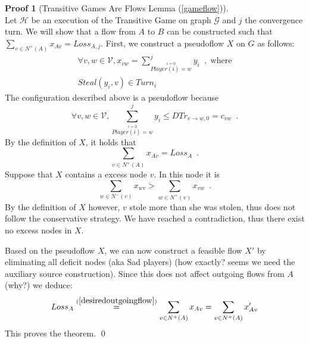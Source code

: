 \documentclass[11pt]{llncs}
\theoremstyle{definition}
\newtheorem{sepproof}{Proof}
\begin{document}
    \begin{sepproof}[Transitive Games Are Flows Lemma (\ref{gameflow})] \ \\
       Let $\mathcal{H}$ be an execution of the Transitive Game on graph $\mathcal{G}$ and $j$ the convergence turn. We will
       show that a flow from $A$ to $B$ can be constructed such that $\sum\limits_{v \in N^{+}\left(A\right)}x_{Av} =
       Loss_{A, j}$. First, we construct a pseudoflow $X$ on $G$ as follows:
       \begin{equation*}
       \begin{gathered}
          \forall v, w \in \mathcal{V}, x_{vw} = \sum\limits_{\overset{i = 0}{Player\left(i\right) = w}}^jy_i \enspace,
          \mbox{ where}\\
          Steal(y_i, v) \in Turn_i
       \end{gathered}
       \end{equation*}
       The configuration described above is a pseudoflow \cite{amo} because 
       \begin{equation*}
           \forall v,w \in \mathcal{V}, \sum\limits_{\overset{i = 0}{Player\left(i\right) = w}}^jy_i \leq
           DTr_{v \rightarrow w, 0} = c_{vw} \enspace.
       \end{equation*}
       By the definition of $X$, it holds that
       \begin{equation}
       \label{desiredoutgoingflow}
           \sum\limits_{v \in N^{+}\left(A\right)}x_{Av} = Loss_A \enspace.
       \end{equation}
       Suppose that $X$ contains a excess node $v$. In this node it is
       \begin{equation*}
          \sum\limits_{w \in N^{-}\left(v\right)}x_{wv} > \sum\limits_{w \in N^{+}\left(v\right)}x_{vw} \enspace.
       \end{equation*}
       By the definition of $X$ however, $v$ stole more than she was stolen, thus does not follow the conservative strategy.
       We have reached a contradiction, thus there exist no excess nodes in $X$.\

       Based on the pseudoflow $X$, we can now construct a feasible flow $X'$ by eliminating all deficit nodes (aka Sad players) (how exactly? seems we need the
       auxiliary source construction). Since this does not affect outgoing flows from $A$ (why?) we deduce:
       \begin{equation*}
          Loss_A \overset{(\ref{desiredoutgoingflow})}{=} \sum\limits_{v \in N^{+}\left(A\right)}x_{Av} =
          \sum\limits_{v \in N^{+}(A)}x'_{Av}
       \end{equation*}
       This proves the theorem. \qed
    \end{sepproof}
\end{document}
